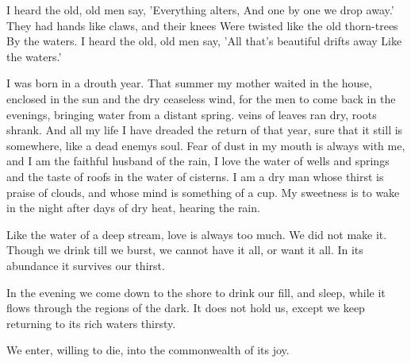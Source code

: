 \documentclass[12pt, letterpaper]{report}
\begin{document}
\clearpage

\author{William Butler Yeats}

\begin{poem}
\begin{stanza}
I heard the old, old men say,\verseline
'Everything alters,\verseline
And one by one we drop away.'\verseline
They had hands like claws, and their knees\verseline
Were twisted like the old thorn-trees\verseline
By the waters.\verseline
I heard the old, old men say,\verseline
'All that's beautiful drifts away\verseline
Like the waters.'
\end{stanza}
\end{poem}

\author{Wendell Berry}

\begin{poem}
\begin{stanza}
I was born in a drouth year. That summer\verseline
my mother waited in the house, enclosed\verseline
in the sun and the dry ceaseless wind,\verseline
for the men to come back in the evenings,\verseline
bringing water from a distant spring.\verseline
veins of leaves ran dry, roots shrank.\verseline
And all my life I have dreaded the return\verseline
of that year, sure that it still is\verseline
somewhere, like a dead enemys soul.\verseline
Fear of dust in my mouth is always with me,\verseline
and I am the faithful husband of the rain,\verseline
I love the water of wells and springs\verseline
and the taste of roofs in the water of cisterns.\verseline
I am a dry man whose thirst is praise\verseline
of clouds, and whose mind is something of a cup.\verseline
My sweetness is to wake in the night\verseline
after days of dry heat, hearing the rain.
\end{stanza}
\end{poem}

\author{Wendell Berry}

\begin{poem}
\begin{stanza}
Like the water\verseline
of a deep stream,\verseline
love is always too much.\verseline
We did not make it.\verseline
Though we drink till we burst,\verseline
we cannot have it all,\verseline
or want it all.\verseline
In its abundance\verseline
it survives our thirst.
\end{stanza}
\begin{stanza}
In the evening we come down to the shore\verseline
to drink our fill,\verseline
and sleep,\verseline
while it flows\verseline
through the regions of the dark.\verseline
It does not hold us,\verseline
except we keep returning to its rich waters\verseline
thirsty.
\end{stanza}
\begin{stanza}
We enter,\verseline
willing to die,\verseline
into the commonwealth of its joy.
\end{stanza}
\end{poem}
\end{document}
